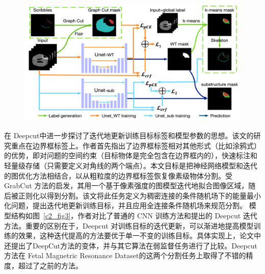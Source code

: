     \begin{figure}[tbp]
        \centering 
        \includegraphics[width=1.0\textwidth]{img/c2/rel_a5.png}
        \label{c2_fig5}
    \end{figure}


在 Deepcut\citep{rajchl2016deepcut}中进一步探讨了迭代地更新训练目标标签和模型参数的思想。该文的研究重点在边界框标签上。作者首先指出了边界框标签相对其他形式（比如涂鸦式）的优势，即对问题的空间约束（目标物体是完全包含在边界框内的），快速标注和轻量级存储（只需要定义对角线的两个端点）。本文目标是把神经网络模型和迭代的图优化方法相结合，以从粗粒度的边界框标签恢复像素级物体分割。受 GrabCut 方法的启发，其用一个基于像素强度的图模型迭代地拟合图像区域，随后被正则化以得到分割。该文将此任务定义为稠密连接的条件随机场下的能量最小化问题，提出迭代地更新训练目标，并且应用全连接条件随机场来规范分割。
模型结构如图~\ref{c2_fig3}，作者对比了普通的 CNN 训练方法和提出的 Deepcut 迭代方法。重要的区别在于，Deepcut 对训练目标的迭代更新，可以渐进地提高模型训练的效果，这种迭代提高的方法要优于单一不变的训练目标。具体实现上，论文中还提出了DeepCut方法的变体，并与其它算法在弱监督任务进行了比较。Deepcut 方法在 Fetal Magnetric Resonance Dataset\citep{damodaram2012foetal}的这两个分割任务上取得了不错的精度，超过了之前的方法。

